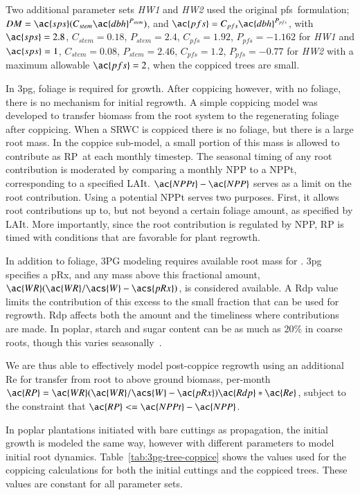 \documentclass[preprint,review,12pt]{elsarticle}
\begin{document}
Two additional parameter sets \emph{HW1} and \emph{HW2} used the
original \ac{pfs}~formulation; $DM=\ac{sps}(C_{stem}
\ac{dbh}^{P_{stem}})$, and $\ac{pfs} = C_{pfs} \ac{dbh}^{P_{pfs}}$,
with $\ac{sps}=2.8$, $C_{stem}=0.18$, $P_{stem}=2.4$, $C_{pfs}=1.92$,
$P_{pfs}=-1.162$ for \emph{HW1} and $\ac{sps}=1$, $C_{stem}=0.08$,
$P_{stem}=2.46$, $C_{pfs}=1.2$, $P_{pfs}=-0.77$ for \emph{HW2} with a
maximum allowable $\ac{pfs}=2$, when the coppiced trees are small.

In \ac{3pg}, foliage is required for growth.  After coppicing however,
with no foliage, there is no mechanism for initial regrowth. A simple
coppicing model was developed to transfer biomass from the root system
to the regenerating foliage after coppicing.  When a \ac{SRWC} is
coppiced there is no foliage, but there is a large root mass.  In the
coppice sub-model, a small portion of this mass is allowed to
contribute as \ac{RP}~at each monthly timestep.  The seasonal timing
of any root contribution is moderated by comparing a monthly \ac{NPP}
to a \ac{NPPt}, corresponding to a specified
\ac{LAIt}. $\ac{NPPt}-\ac{NPP}$ serves as a limit on the root
contribution.  Using a potential \ac{NPPt} serves two purposes. First,
it allows root contributions up to, but not beyond a certain foliage
amount, as specified by \ac{LAIt}.  More importantly, since the root
contribution is regulated by \ac{NPP}, \ac{RP} is timed with
conditions that are favorable for plant regrowth.

In addition to foliage, 3PG modeling requires available root mass for .  \ac{3pg} specifies a \ac{pRx},
and any mass above this fractional amount,
$\ac{WR}(\ac{WR}/\acs{W}-\acs{pRx})$, is considered available.  A
\ac{Rdp} value limits the contribution of this excess to the small
fraction that can be used for regrowth. \ac{Rdp} affects both the
amount and the timeliness where contributions are made.  In poplar,
starch and sugar content can be as much as 20\% in coarse roots,
though this varies seasonally~\cite{Regier2010}.

We are thus able to effectively model post-coppice regrowth using an additional \ac{Re} for transfer from root to above ground
biomass, per-month $\ac{RP} =
\ac{WR}(\ac{WR}/\acs{W}-\ac{pRx})\ac{Rdp}*\ac{Re}$, subject to the
constraint that $\ac{RP} <= \ac{NPPt}-\ac{NPP}$.

In poplar plantations initiated with bare
cuttings as propagation, the initial growth is modeled the same way,
however with different parameters to model initial root dynamics.
Table~\ref{tab:3pg-tree-coppice} shows the values used for the
coppicing calculations for both the initial cuttings and the coppiced
trees.  These values are constant for all parameter sets.
\end{document}
